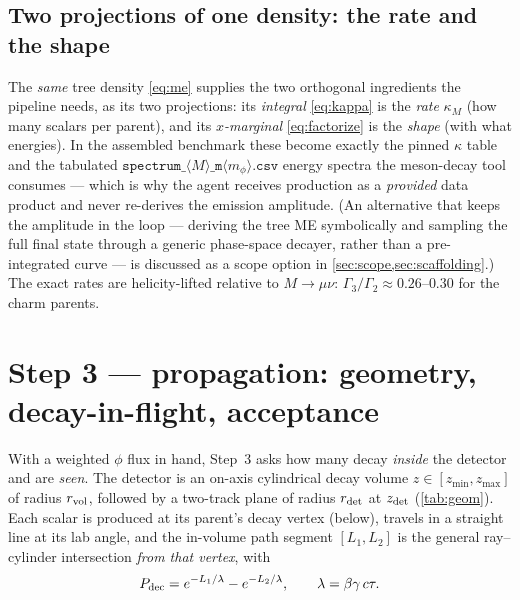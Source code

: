 \documentclass[11pt]{article}
\newcommand{\mphi}{m_\phi}
\begin{document}
\subsection{Two projections of one density: the rate and the shape}
\label{sec:projections}

The \emph{same} tree density \cref{eq:me} supplies the two orthogonal ingredients
the pipeline needs, as its two projections: its \emph{integral} \cref{eq:kappa}
is the \emph{rate} $\kappa_M$ (how many scalars per parent), and its
\emph{$x$-marginal} \cref{eq:factorize} is the \emph{shape} (with what energies).
In the assembled benchmark these become exactly the pinned $\kappa$ table and the
tabulated $\texttt{spectrum\_}\langle M\rangle\texttt{\_m}\langle\mphi\rangle
\texttt{.csv}$ energy spectra the meson-decay tool consumes --- which is why the
agent receives production as a \emph{provided} data product and never re-derives
the emission amplitude. (An alternative that keeps the amplitude in the loop ---
deriving the tree ME symbolically and sampling the full final state through a
generic phase-space decayer, rather than a pre-integrated curve --- is discussed
as a scope option in \cref{sec:scope,sec:scaffolding}.) The exact rates are
helicity-lifted relative to $M\to\mu\nu$: $\Gamma_3/\Gamma_2\approx0.26$--$0.30$
for the charm parents.

\section{Step 3 --- propagation: geometry, decay-in-flight, acceptance}
\label{sec:prop}

With a weighted $\phi$ flux in hand, Step~3 asks how many decay \emph{inside} the
detector and are \emph{seen}. The detector is an on-axis cylindrical decay volume
$z\in[z_{\min},z_{\max}]$ of radius $r_{\rm vol}$, followed by a two-track plane
of radius $r_{\rm det}$ at $z_{\rm det}$ (\cref{tab:geom}). Each scalar is
produced at its parent's decay vertex (below), travels in a straight line at its
lab angle, and the in-volume path segment $[L_1,L_2]$ is the general
ray--cylinder intersection \emph{from that vertex}, with
\begin{equation}
P_{\rm dec} = e^{-L_1/\lambda} - e^{-L_2/\lambda},\qquad
\lambda=\beta\gamma\,c\tau .
\end{equation}
\end{document}
